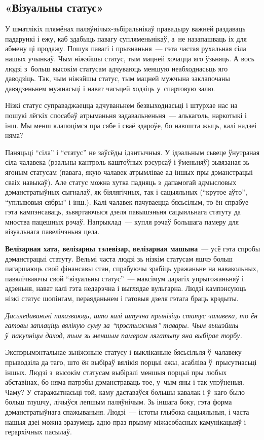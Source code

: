 \subsection*{«Візуальны статус»}

У шматлікіх плямёнах паляўнічых-зьбі\-раль\-ні\-каў правадыру важней раздаваць падарункі і ежу, каб здабыць павагу супляменьнікаў, а~не назапашваць іх для абмену ці продажу. Пошук павагі і прызнаньня~--- гэта частая рухальная сіла нашых учынкаў. Чым ніжэйшы статус, тым мацней хочацца яго ўзьняць. А вось людзі з~больш высокім статусам адчуваюць меншую неабходнасьць яго даводзіць. Так, чым ніжэйшы статус, тым мацней мужчына заклапочаны давядзеньнем мужнасьці і нават часьцей ходзіць у~спартовую залю.

Нізкі статус суправаджаецца адчуваньнем безвыходнасьці і штурхае нас на пошукі лёгкіх спосабаў атрыманьня задавальненьня~--- алькаголь, наркотыкі і інш. Мы менш клапоцімся пра сябе і сваё здароўе, бо навошта жыць, калі надзеі няма?

Паняцьці ``сіла'' і ``статус'' не заўсёды ідэнтычныя. У ідэальным сьвеце ўнутраная сіла чалавека (рэальны кантроль каштоўных рэсурсаў і ўменьняў) зьвязаная зь ягоным статусам (павага, якую чалавек атрымлівае ад іншых пры дэманстрацыі сваіх навыкаў). Але статус можна хутка падняць з~дапамогай адмысловых дэманстратыўных сыгналаў, як біялягічных, так і сацыяльных (``крутое аўто'', ``уплывовыя сябры'' і інш.). Калі чалавек пачуваецца бясьсілым, то ён спрабуе гэта кампэнсаваць, зьвяртаючыся дзеля павышэньня сацыяльнага статуту да мноства пацешных рэчаў. Напрыклад~--- купля рэчаў большага памеру для візуальнага павелічэньня цела.

\textbf{Велізарная хата, велізарны тэлевізар, велізарная машына}~--- усё гэта спробы дэманстрацыі статуту. Вельмі часта людзі зь нізкім статусам яшчэ больш пагаршаюць свой фінансавы стан, спрабуючы зрабіць уражаньне на навакольных, павялічваючы свой ``візуальны статус''~--- максімум дарагіх упрыгожаньняў і адзеньня, нават калі гэта недарэчна і выглядае вульгарна. Людзі кампэнсуюць нізкі статус шопінгам, пераяданьнем і гатовыя дзеля гэтага браць крэдыты.

\emph{Дасьледаваньні паказваюць, што калі штучна прынізіць статус чалавека, то ён гатовы заплаціць вялікую суму за ``прэстыжныя'' тавары. Чым вышэйшы ў~пакупніцы даход, тым зь меншым памерам лягатыпу яна выбірае торбу.}

Экспэрымэнтальнае зьніжэньне статусу і выкліканьне бясьсільля ў~чалавеку прыводзіла да таго, што ён выбіраў вялікія порцыі ежы, асабліва ў~прысутнасьці іншых. Людзі з~высокім статусам выбіралі меншыя порцыі пры любых абставінах, бо няма патрэбы дэманстраваць тое, у~чым яны і так упэўненыя. Чаму? У старажытнасьці той, каму даставаўся большы кавалак і ў~каго было больш тлушчу, лічыўся лепшым паляўнічым. Зь іншага боку, гэта форма дэманстратыўнага спажываньня. Людзі~--- істоты глыбока сацыяльныя, і часта нашыя дзеі можна зразумець адно праз прызму міжасобасных камунікацыяў і герархічных пасылаў.

